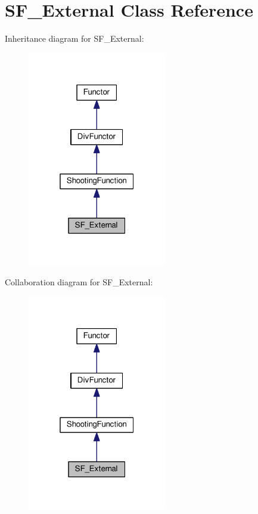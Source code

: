 \hypertarget{classSF__External}{}\section{S\+F\+\_\+\+External Class Reference}
\label{classSF__External}


Inheritance diagram for S\+F\+\_\+\+External\+:\nopagebreak
\begin{figure}[H]
\begin{center}
\leavevmode
\includegraphics[width=172pt]{classSF__External__inherit__graph}
\end{center}
\end{figure}


Collaboration diagram for S\+F\+\_\+\+External\+:\nopagebreak
\begin{figure}[H]
\begin{center}
\leavevmode
\includegraphics[width=172pt]{classSF__External__coll__graph}
\end{center}
\end{figure}
